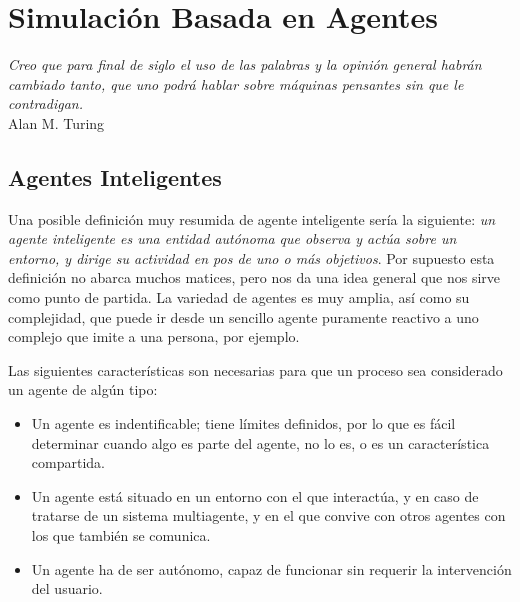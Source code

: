 \chapter*{Simulación Basada en Agentes} \label{cap1}

\begin{flushright}
\begin{minipage}{7.85cm}
    {\em Creo que para final de siglo el uso de las palabras y la opinión
    general habrán cambiado tanto, que uno podrá hablar sobre máquinas pensantes
    sin que le contradigan.} \\ Alan M. Turing
\end{minipage}
\end{flushright}

\vspace*{5mm}

\section{Agentes Inteligentes}


Una posible definición muy resumida de agente inteligente sería la siguiente:
{\em un agente inteligente es una entidad autónoma que observa y actúa sobre un
entorno, y dirige su actividad en pos de uno o más objetivos}. Por supuesto
esta definición no abarca muchos matices, pero nos da una idea general que nos
sirve como punto de partida. La variedad de agentes es muy amplia, así como
su complejidad, que puede ir desde un sencillo agente puramente reactivo a uno
complejo que imite a una persona, por ejemplo.

Las siguientes características son necesarias para que un proceso sea
considerado un agente de algún tipo\cite{Macal06}:

\begin{itemize}
 \item Un agente es indentificable; tiene límites definidos, por lo que es fácil
 determinar cuando algo es parte del agente, no lo es, o es un característica
 compartida.
 \item Un agente está situado en un entorno con el que interactúa, y en caso de
 tratarse de un sistema multiagente, y en el que convive con otros agentes con
 los que también se comunica.
 \item Un agente ha de ser autónomo, capaz de funcionar sin requerir la
 intervención del usuario.
\end{itemize}

